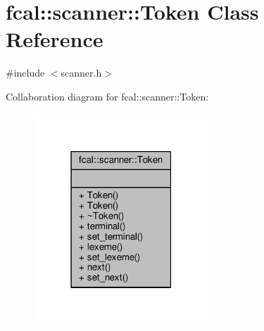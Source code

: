 \hypertarget{classfcal_1_1scanner_1_1Token}{}\section{fcal\+:\+:scanner\+:\+:Token Class Reference}
\label{classfcal_1_1scanner_1_1Token}


{\ttfamily \#include $<$scanner.\+h$>$}



Collaboration diagram for fcal\+:\+:scanner\+:\+:Token\+:
\nopagebreak
\begin{figure}[H]
\begin{center}
\leavevmode
\includegraphics[width=186pt]{classfcal_1_1scanner_1_1Token__coll__graph}
\end{center}
\end{figure}
